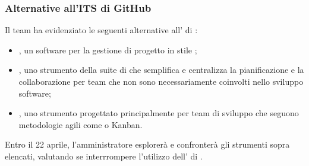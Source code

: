\newpage
\subsubsection{Alternative all'ITS di GitHub}
\par Il team ha evidenziato le seguenti alternative all' di :
\begin{itemize}
  \item {}, un software per la gestione di progetto in stile ;
  \item {}, uno strumento della suite di  che semplifica e centralizza la pianificazione e la collaborazione per team che non sono necessariamente coinvolti nello sviluppo software;
  \item {}, uno strumento progettato principalmente per team di sviluppo che seguono metodologie agili come  o Kanban.
\end{itemize}

\vspace{0.5\baselineskip}
\par Entro il 22 aprile, l'amministratore esplorerà e confronterà gli strumenti sopra elencati, valutando se interrrompere l'utilizzo dell' di .